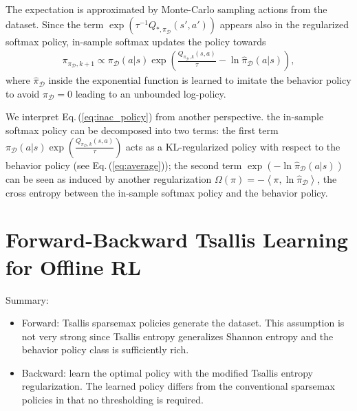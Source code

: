 \documentclass{article}
\newcommand{\AdaBracket}[1]{\left(#1\right)}
\newcommand{\AdaAngleProduct}[2]{\left\langle#1, #2\right\rangle}
\newcommand{\eq}[1]{Eq.\,(#1)}
\newcommand{\datasetOptimalQ}{Q_{*, \pi_{\mathcal{D}}}}
\newcommand{\datasetPolicy}{\pi_{\mathcal{D}}}
\begin{document}
The expectation is approximated by Monte-Carlo sampling actions from the dataset.
Since the term $\exp\AdaBracket{\tau^{-1}\datasetOptimalQ (s',a')}$ appears also in the regularized softmax policy, in-sample softmax updates the policy towards 
\begin{align}
    \pi_{\datasetPolicy, k+1} \propto  \datasetPolicy(a|s) \exp\AdaBracket{\frac{Q_{\datasetPolicy, k}(s,a)}{\tau} - \ln\hat{\pi}_{\mathcal{D}}(a|s)},
    \label{eq:inac_policy}
\end{align}
where $\hat{\pi}_{\mathcal{D}}$ inside the exponential function is learned to imitate the behavior policy to avoid $\pi_{\mathcal{D}} = 0$ leading to an unbounded log-policy.

We interpret \eq{\ref{eq:inac_policy}} from another perspective.
the in-sample softmax policy can be decomposed into two terms:
the first term $\datasetPolicy(a|s) \exp\AdaBracket{\frac{Q_{\datasetPolicy, k}(s,a)}{\tau} }$ acts as a KL-regularized policy with respect to the behavior policy (see \eq{\ref{eq:average}}); 
the second term $\exp\AdaBracket{-\ln\hat{\pi}_{\mathcal{D}}(a|s)}$ can be seen as induced by another regularization $\Omega(\pi) = -\AdaAngleProduct{\pi}{\ln{\hat{\pi}_{\mathcal{D}}}}$, the cross entropy between the in-sample softmax policy and the behavior policy.


\section{Forward-Backward Tsallis Learning for Offline RL}

Summary:
\begin{itemize}
    \item Forward: Tsallis sparsemax policies generate the dataset. This assumption is not very strong since Tsallis entropy generalizes Shannon entropy and the behavior policy class is sufficiently rich.
    \item Backward: learn the optimal policy with the modified Tsallis entropy regularization. The learned policy differs from the conventional sparsemax policies in that no thresholding is required.
\end{itemize}
\end{document}
